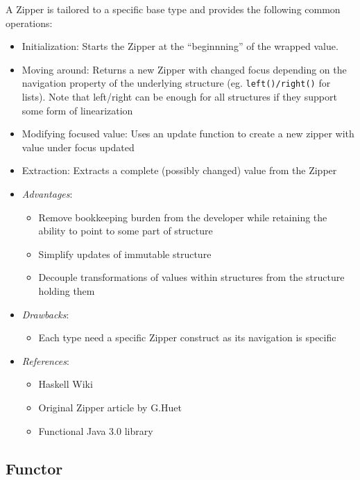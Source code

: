 \documentclass[11pt,]{article}
\begin{document}
A Zipper is tailored to a specific base type and provides the following
common operations:

\begin{itemize}
\item
  Initialization: Starts the Zipper at the ``beginnning'' of the wrapped
  value.
\item
  Moving around: Returns a new Zipper with changed focus depending on
  the navigation property of the underlying structure (eg.
  \texttt{left()/right()} for lists). Note that left/right can be enough
  for all structures if they support some form of linearization
\item
  Modifying focused value: Uses an update function to create a new
  zipper with value under focus updated
\item
  Extraction: Extracts a complete (possibly changed) value from the
  Zipper
\item
  \emph{Advantages}:

  \begin{itemize}
  \item
    Remove bookkeeping burden from the developer while retaining the
    ability to point to some part of structure
  \item
    Simplify updates of immutable structure
  \item
    Decouple transformations of values within structures from the
    structure holding them
  \end{itemize}
\item
  \emph{Drawbacks}:

  \begin{itemize}
  \item
    Each type need a specific Zipper construct as its navigation is
    specific
  \end{itemize}
\item
  \emph{References}:

  \begin{itemize}
  \item
    Haskell Wiki
  \item
    Original Zipper article by G.Huet
  \item
    Functional Java 3.0 library
  \end{itemize}
\end{itemize}

\subsection{Functor}
\end{document}
